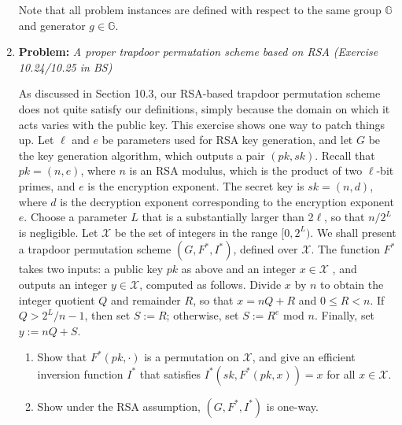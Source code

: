 \documentclass[11pt]{article}
\begin{document}
\begin{enumerate}
\begin{enumerate}
		\end{enumerate}
	
		Note that all problem instances are defined with respect to the same group $\mathbb{G}$ and generator $g \in \mathbb{G}$.
		
		\item
		\textbf{Problem:} \textit{A proper trapdoor permutation scheme based on RSA (Exercise 10.24/10.25 in BS)}
		
		As discussed in Section 10.3, our RSA-based trapdoor permutation scheme does not quite satisfy our definitions,
		simply because the domain on which it acts varies with the public key. This exercise shows one way
		to patch things up. Let $\ell$ and $e$ be parameters used for RSA key generation, and let $G$ be the key
		generation algorithm, which outputs a pair $(pk , sk )$. Recall that $pk = (n, e)$, where $n$ is an RSA
		modulus, which is the product of two $\ell$-bit primes, and $e$ is the encryption exponent. The secret
		key is $sk = (n, d)$, where $d$ is the decryption exponent corresponding to the encryption exponent $e$.
		Choose a parameter $L$ that is a substantially larger than 2$\ell$, so that $n/2^L$ is negligible. Let $\mathcal{X}$ be
		the set of integers in the range $[0, 2^L )$. We shall present a trapdoor permutation scheme $(G, F^{\ast} , I^{\ast} )$, defined over $\mathcal{X}$. The function $F^{\ast}$ takes two inputs: a public key $pk$ as above and an integer $x \in \mathcal{X}$ ,
		and outputs an integer $y \in \mathcal{X}$, computed as follows. Divide $x$ by $n$ to obtain the integer quotient
		$Q$ and remainder $R$, so that $x = nQ + R$ and $0 \leq R < n$. If $Q > 2^L / n - 1$, then set $S := R$;
		otherwise, set $S := R^e$ mod $n$. Finally, set $y := nQ + S$.
		
		\begin{enumerate}
			\item Show that $F^{\ast} (pk, \cdot)$ is a permutation on $\mathcal{X}$, and give an efficient inversion function $I^{\ast}$ that
			satisfies $I^{\ast} (sk , F^{\ast} (pk , x)) = x$ for all $x \in \mathcal{X}$.
			\item Show under the RSA assumption, $(G, F^{\ast} , I^{\ast})$ is one-way.
		\end{enumerate}
		
		
		
	\end{enumerate}
	
\end{document}
